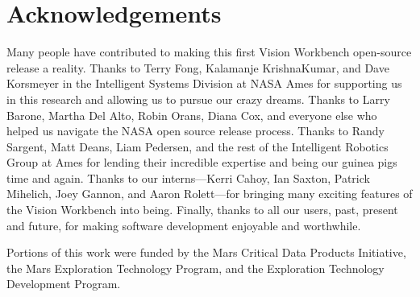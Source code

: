 \chapter*{Acknowledgements}

Many people have contributed to making this first Vision Workbench
open-source release a reality.  Thanks to Terry Fong, Kalamanje
KrishnaKumar, and Dave Korsmeyer in the Intelligent Systems Division
at NASA Ames for supporting us in this research and allowing us to
pursue our crazy dreams.  Thanks to Larry Barone, Martha Del Alto,
Robin Orans, Diana Cox, and everyone else who helped us navigate the
NASA open source release process.  Thanks to Randy Sargent, Matt
Deans, Liam Pedersen, and the rest of the Intelligent Robotics Group
at Ames for lending their incredible expertise and being our guinea
pigs time and again.  Thanks to our interns---Kerri Cahoy, Ian Saxton,
Patrick Mihelich, Joey Gannon, and Aaron Rolett---for bringing many
exciting features of the Vision Workbench into being.  Finally, thanks
to all our users, past, present and future, for making software
development enjoyable and worthwhile.

Portions of this work were funded by the Mars Critical Data Products
Initiative, the Mars Exploration Technology Program, and the
Exploration Technology Development Program.
